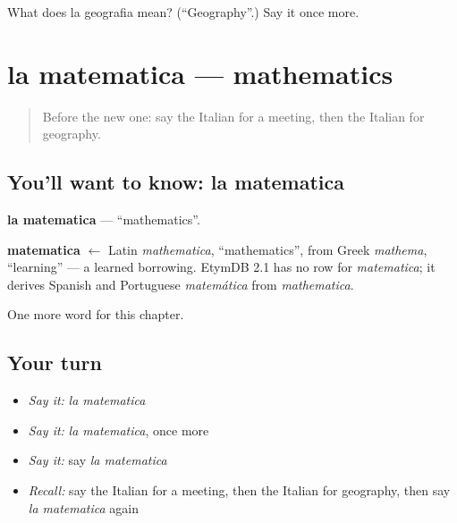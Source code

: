 \begin{tcolorbox}[breakable,colback=teal!4,colframe=teal!35!black,title={Before you move on}]
What does la geografia mean? (\textquotedblleft{}Geography\textquotedblright{}.) Say it once more.
\end{tcolorbox}
\section[la matematica]{la matematica — mathematics}

\label{lesson:IT-C173-matematica}



\begin{quote}
Before the new one: say the Italian for a meeting, then the Italian for geography.
\end{quote}

\subsection*{You'll want to know: la matematica}
\textbf{la matematica} — \textquotedblleft{}mathematics\textquotedblright{}.

\begin{cousinweb}
\textbf{matematica} $\leftarrow$ Latin \emph{mathematica}, \textquotedblleft{}mathematics\textquotedblright{}, from Greek \emph{mathema}, \textquotedblleft{}learning\textquotedblright{} — a learned borrowing. EtymDB 2.1 has no row for \emph{matematica}; it derives Spanish and Portuguese \emph{matemática} from \emph{mathematica}.
\end{cousinweb}

\begin{grammarlens}[title={What you've built}]
One more word for this chapter.
\end{grammarlens}

\subsection*{Your turn}
\begin{itemize}
\raggedright
  \item \emph{Say it:} \emph{la matematica}
  \item \emph{Say it:} \emph{la matematica}, once more
  \item \emph{Say it:} say \emph{la matematica}
  \item \emph{Recall:} say the Italian for a meeting, then the Italian for geography, then say \emph{la matematica} again
\end{itemize}


